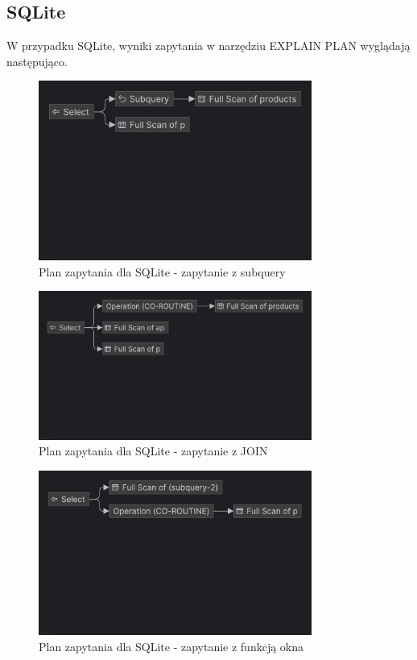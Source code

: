 \documentclass{article}
\begin{document}
\subsection*{SQLite}

W przypadku SQLite, wyniki zapytania w narzędziu EXPLAIN PLAN wyglądają następująco.

\begin{figure}[H]
    \centering
    \includegraphics[width=0.8\textwidth]{../images/sqlite_subquery_explain.png}
    \caption{Plan zapytania dla SQLite - zapytanie z subquery}
    \label{fig:sqlite1}
\end{figure}

\begin{figure}[H]
    \centering
    \includegraphics[width=0.8\textwidth]{../images/sqlite_join_explain.png}
    \caption{Plan zapytania dla SQLite - zapytanie z JOIN}
    \label{fig:sqlite2}
\end{figure}

\begin{figure}[H]
    \centering
    \includegraphics[width=0.8\textwidth]{../images/sqlite_window_explain.png}
    \caption{Plan zapytania dla SQLite - zapytanie z funkcją okna}
    \label{fig:sqlite3}
\end{figure}
\end{document}
